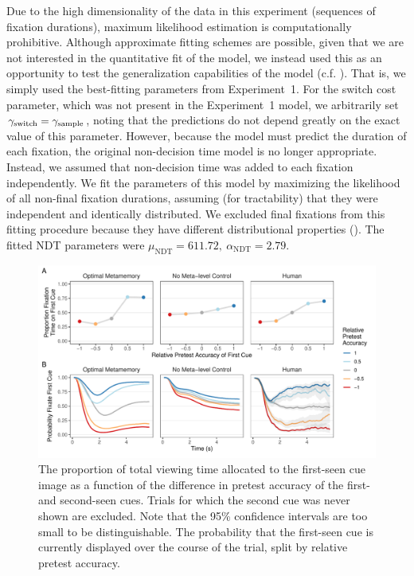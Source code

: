 Due to the high dimensionality of the data in this experiment (sequences of fixation durations), maximum likelihood estimation is computationally prohibitive. Although approximate fitting schemes are possible, given that we are not interested in the quantitative fit of the model, we instead used this as an opportunity to test the generalization capabilities of the model (c.f. \citealp{krajbich2011multialternative}). That is, we simply used the best-fitting parameters from Experiment~1. For the switch cost parameter, which was not present in the Experiment~1 model, we arbitrarily set $\gamma_\text{switch} = \gamma_\text{sample}$, noting that the predictions do not depend greatly on the exact value of this parameter. However, because the model must predict the duration of each fixation, the original non-decision time model is no longer appropriate. Instead, we assumed that non-decision time was added to each fixation independently. We fit the parameters of this model by maximizing the likelihood of all non-final fixation durations, assuming (for tractability) that they were independent and identically distributed. We excluded final fixations from this fitting procedure because they have different distributional properties (). The fitted NDT parameters were \(
            \mu_\text{NDT} = 611.72,\ 
            \alpha_\text{NDT} = 2.79
        \).


\begin{figure}[ht]
  \centering
  \includegraphics[scale=.65]{figs/memory/exp2/overall_timecourse.pdf}
  \caption{\captiontitle{Attention is drawn to stronger cues.}
     The proportion of total viewing time allocated to the first-seen cue image as a function of the difference in pretest accuracy of the first- and second-seen cues. Trials for which the second cue was never shown are excluded. Note that the 95\% confidence intervals are too small to be distinguishable.
    \subcap{B} The probability that the first-seen cue is currently displayed over the course of the trial, split by relative pretest accuracy.
  \label{fig:timecourse}
  }
\end{figure}

